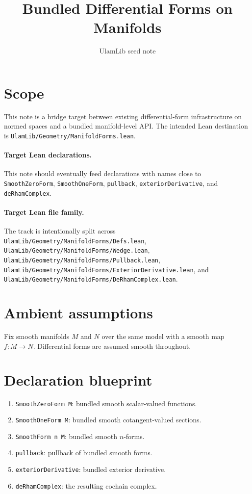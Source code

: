 \documentclass[11pt]{article}
\title{Bundled Differential Forms on Manifolds}
\author{UlamLib seed note}
\date{}
\begin{document}
\maketitle

\section{Scope}

This note is a bridge target between existing differential-form infrastructure
on normed spaces and a bundled manifold-level API. The intended Lean
destination is \texttt{UlamLib/Geometry/ManifoldForms.lean}.

\paragraph{Target Lean declarations.}
This note should eventually feed declarations with names close to
\texttt{SmoothZeroForm}, \texttt{SmoothOneForm}, \texttt{pullback},
\texttt{exteriorDerivative}, and \texttt{deRhamComplex}.

\paragraph{Target Lean file family.}
The track is intentionally split across
\texttt{UlamLib/Geometry/ManifoldForms/Defs.lean},
\texttt{UlamLib/Geometry/ManifoldForms/Wedge.lean},
\texttt{UlamLib/Geometry/ManifoldForms/Pullback.lean},
\texttt{UlamLib/Geometry/ManifoldForms/ExteriorDerivative.lean}, and
\texttt{UlamLib/Geometry/ManifoldForms/DeRhamComplex.lean}.

\section{Ambient assumptions}

Fix smooth manifolds $M$ and $N$ over the same model with a smooth map
$f : M \to N$. Differential forms are assumed smooth throughout.

\section{Declaration blueprint}

\begin{enumerate}
\item \texttt{SmoothZeroForm M}: bundled smooth scalar-valued functions.
\item \texttt{SmoothOneForm M}: bundled smooth cotangent-valued sections.
\item \texttt{SmoothForm n M}: bundled smooth $n$-forms.
\item \texttt{pullback}: pullback of bundled smooth forms.
\item \texttt{exteriorDerivative}: bundled exterior derivative.
\item \texttt{deRhamComplex}: the resulting cochain complex.
\end{enumerate}
\end{document}
